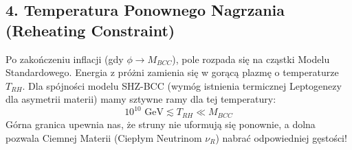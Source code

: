 \documentclass[11pt,a4paper]{article}
\begin{document}
\subsection*{4. Temperatura Ponownego Nagrzania (Reheating Constraint)}
Po zakończeniu inflacji (gdy $\phi \to M_{BCC}$), pole rozpada się na cząstki Modelu Standardowego. Energia z próżni zamienia się w gorącą plazmę o temperaturze $T_{RH}$. Dla spójności modelu SHZ-BCC (wymóg istnienia termicznej Leptogenezy dla asymetrii materii) mamy sztywne ramy dla tej temperatury:
\begin{equation}
    10^{10} \text{ GeV} \lesssim T_{RH} \ll M_{BCC}
\end{equation}
Górna granica upewnia nas, że struny nie uformują się ponownie, a dolna pozwala Ciemnej Materii (Ciepłym Neutrinom $\nu_R$) nabrać odpowiedniej gęstości!
\end{document}
